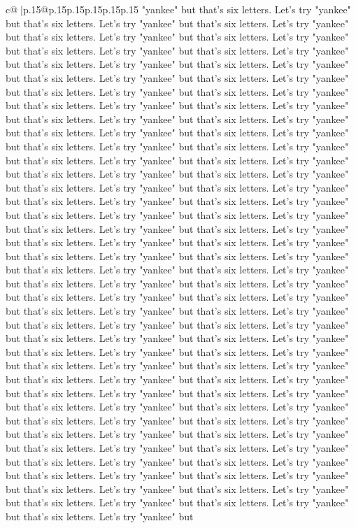 \documentclass{article}
\begin{document}
{\begin{supertabular}{c@{$\;$}|p{.15\linewidth}@{}p{.15\linewidth}p{.15\linewidth}p{.15\linewidth}p{.15\linewidth}p{.15\linewidth}}
{{{"yankee" but that's six letters. Let's try "yankee" but that's six letters. Let's try "yankee" but that's six letters. Let's try "yankee" but that's six letters. Let's try "yankee" but that's six letters. Let's try "yankee" but that's six letters. Let's try "yankee" but that's six letters. Let's try "yankee" but that's six letters. Let's try "yankee" but that's six letters. Let's try "yankee" but that's six letters. Let's try "yankee" but that's six letters. Let's try "yankee" but that's six letters. Let's try "yankee" but that's six letters. Let's try "yankee" but that's six letters. Let's try "yankee" but that's six letters. Let's try "yankee" but that's six letters. Let's try "yankee" but that's six letters. Let's try "yankee" but that's six letters. Let's try "yankee" but that's six letters. Let's try "yankee" but that's six letters. Let's try "yankee" but that's six letters. Let's try "yankee" but that's six letters. Let's try "yankee" but that's six letters. Let's try "yankee" but that's six letters. Let's try "yankee" but that's six letters. Let's try "yankee" but that's six letters. Let's try "yankee" but that's six letters. Let's try "yankee" but that's six letters. Let's try "yankee" but that's six letters. Let's try "yankee" but that's six letters. Let's try "yankee" but that's six letters. Let's try "yankee" but that's six letters. Let's try "yankee" but that's six letters. Let's try "yankee" but that's six letters. Let's try "yankee" but that's six letters. Let's try "yankee" but that's six letters. Let's try "yankee" but that's six letters. Let's try "yankee" but that's six letters. Let's try "yankee" but that's six letters. Let's try "yankee" but that's six letters. Let's try "yankee" but that's six letters. Let's try "yankee" but that's six letters. Let's try "yankee" but that's six letters. Let's try "yankee" but that's six letters. Let's try "yankee" but that's six letters. Let's try "yankee" but that's six letters. Let's try "yankee" but that's six letters. Let's try "yankee" but that's six letters. Let's try "yankee" but that's six letters. Let's try "yankee" but that's six letters. Let's try "yankee" but that's six letters. Let's try "yankee" but that's six letters. Let's try "yankee" but that's six letters. Let's try "yankee" but that's six letters. Let's try "yankee" but that's six letters. Let's try "yankee" but that's six letters. Let's try "yankee" but that's six letters. Let's try "yankee" but that's six letters. Let's try "yankee" but that's six letters. Let's try "yankee" but that's six letters. Let's try "yankee" but that's six letters. Let's try "yankee" but that's six letters. Let's try "yankee" but that's six letters. Let's try "yankee" but that's six letters. Let's try "yankee" but that's six letters. Let's try "yankee" but that's six letters. Let's try "yankee" but that's six letters. Let's try "yankee" but that's six letters. Let's try "yankee" but that's six letters. Let's try "yankee" but that's six letters. Let's try "yankee" but that's six letters. Let's try "yankee" but that's six letters. Let's try "yankee" but that's six letters. Let's try "yankee" but that's six letters. Let's try "yankee" but }}}
\end{supertabular}}
\end{document}
